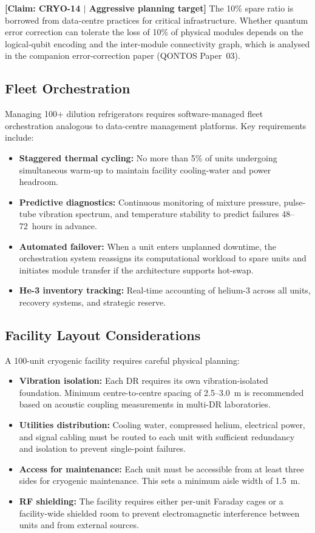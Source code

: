\documentclass[conference]{IEEEtran}
\begin{document}
\textbf{[Claim: CRYO-14 $|$ Aggressive planning target]} The 10\% spare ratio is borrowed from data-centre practices for critical infrastructure. Whether quantum error correction can tolerate the loss of 10\% of physical modules depends on the logical-qubit encoding and the inter-module connectivity graph, which is analysed in the companion error-correction paper (QONTOS Paper~03).

\subsection{Fleet Orchestration}

Managing 100+ dilution refrigerators requires software-managed fleet orchestration analogous to data-centre management platforms. Key requirements include:

\begin{itemize}
\item \textbf{Staggered thermal cycling:} No more than 5\% of units undergoing simultaneous warm-up to maintain facility cooling-water and power headroom.
\item \textbf{Predictive diagnostics:} Continuous monitoring of mixture pressure, pulse-tube vibration spectrum, and temperature stability to predict failures 48--72~hours in advance.
\item \textbf{Automated failover:} When a unit enters unplanned downtime, the orchestration system reassigns its computational workload to spare units and initiates module transfer if the architecture supports hot-swap.
\item \textbf{He-3 inventory tracking:} Real-time accounting of helium-3 across all units, recovery systems, and strategic reserve.
\end{itemize}

\subsection{Facility Layout Considerations}

A 100-unit cryogenic facility requires careful physical planning:

\begin{itemize}
\item \textbf{Vibration isolation:} Each DR requires its own vibration-isolated foundation. Minimum centre-to-centre spacing of 2.5--3.0~m is recommended based on acoustic coupling measurements in multi-DR laboratories.
\item \textbf{Utilities distribution:} Cooling water, compressed helium, electrical power, and signal cabling must be routed to each unit with sufficient redundancy and isolation to prevent single-point failures.
\item \textbf{Access for maintenance:} Each unit must be accessible from at least three sides for cryogenic maintenance. This sets a minimum aisle width of 1.5~m.
\item \textbf{RF shielding:} The facility requires either per-unit Faraday cages or a facility-wide shielded room to prevent electromagnetic interference between units and from external sources.
\end{itemize}
\end{document}
